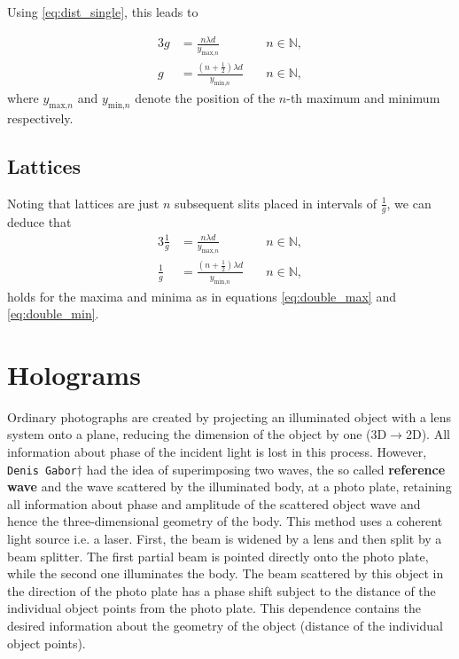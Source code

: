 Using \autoref{eq:dist_single}, this leads to

\begin{alignat}{3}
 	g &= \frac{n\lambda d}{y_{\text{max,}n}} &\quad n\in\mathbb{N},\label{eq:double_max} \\
	g &= \frac{\left(n+\frac{1}{2}\right)\lambda d}{y_{\text{min,}n}} &\quad n\in\mathbb{N}, \label{eq:double_min}
\end{alignat}
where $y_{\text{max,}n}$ and $y_{\text{min,}n}$ denote the position of the $n$-th maximum and minimum respectively.

\subsection{Lattices}\label{subsec:lattices}
Noting that lattices are just $n$ subsequent slits placed in intervals of $\frac{1}{g}$, we can deduce that
\begin{alignat}{3}
 	\frac{1}{g} &= \frac{n\lambda d}{y_{\text{max,}n}} &\quad n\in\mathbb{N},\label{eq:lattice_max} \\
	\frac{1}{g} &= \frac{\left(n+\frac{1}{2}\right)\lambda d}{y_{\text{min,}n}} &\quad n\in\mathbb{N}, \label{eq:lattice_min}
\end{alignat}
holds for the maxima and minima as in equations \ref{eq:double_max} and \ref{eq:double_min}.

\section{Holograms}\label{sec:holograms}
Ordinary photographs are created by projecting an illuminated object with a lens system onto a plane, reducing the dimension of the object by one (3D$\rightarrow$2D).
All information about phase of the incident light is lost in this process.
However, \texttt{Denis Gabor}$\dagger$ had the idea of superimposing two waves, the so called \textbf{reference wave} and the wave scattered by the illuminated body, at a photo plate, retaining all information about phase and amplitude of the scattered object wave and hence the three-dimensional geometry of the body.
This method uses a coherent light source i.e. a laser.
First, the beam is widened by a lens and then split by a beam splitter.
The first partial beam is pointed directly onto the photo plate, while the second one illuminates the body.
The beam scattered by this object in the direction of the photo plate has a phase shift subject to the distance of the individual object points from the photo plate.
This dependence contains the desired information about the geometry of the object (distance of the individual object points).
